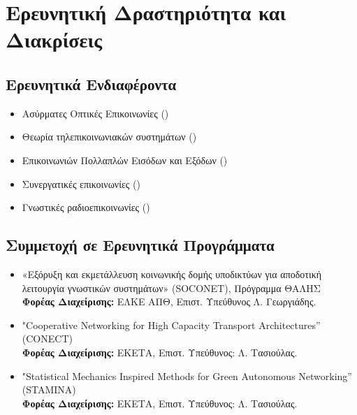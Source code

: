 \documentclass[11pt]{article}
\begin{document}
\section{Ερευνητική Δραστηριότητα και Διακρίσεις}

\subsection{Ερευνητικά Ενδιαφέροντα}
\begin{itemize}
\item Ασύρματες Οπτικές Επικοινωνίες ()
\item \greektext Θεωρία τηλεπικοινωνιακών συστημάτων ()
\item {} Επικοινωνιών Πολλαπλών Εισόδων και Εξόδων ()
\item \greektext Συνεργατικές επικοινωνίες ()
\item \greektext Γνωστικές ραδιοεπικοινωνίες ()
\end{itemize}

\subsection{Συμμετοχή σε Ερευνητικά Προγράμματα}
\begin{itemize}

\item  \greektext «Εξόρυξη και εκμετάλλευση κοινωνικής δομής υποδικτύων για αποδοτική λειτουργία γνωστικών συστημάτων» (\latintext SOCONET), \greektext Πρόγραμμα ΘΑΛΗΣ \\ \textbf{Φορέας Διαχείρισης:} ΕΛΚΕ ΑΠΘ, Επιστ. Υπεύθυνος Λ. Γεωργιάδης.

\item \latintext "Cooperative Networking for High Capacity Transport Architectures'' (CONECT) \greektext \\ \textbf{Φορέας Διαχείρισης:} ΕΚΕΤΑ, Επιστ. Υπεύθυνος: Λ. Τασιούλας.

\item \latintext "Statistical Mechanics Inspired Methods for Green Autonomous Networking'' (STAMINA) \greektext \\ \textbf{Φορέας Διαχείρισης:} ΕΚΕΤΑ, Επιστ. Υπεύθυνος: Λ. Τασιούλας. \end{itemize}
\end{document}
